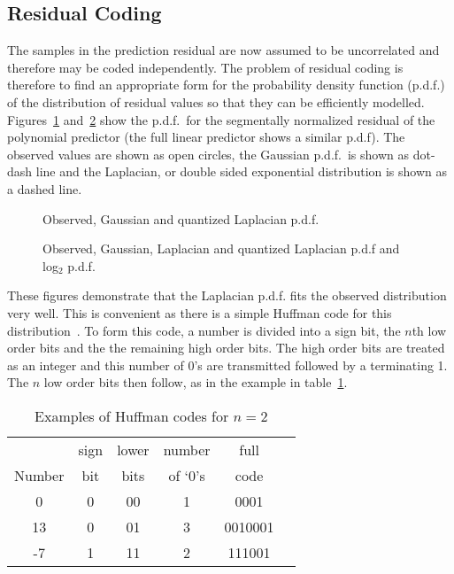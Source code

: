 \subsection{Residual Coding\label{sect:resid}}

The samples in the prediction residual are now assumed to be
uncorrelated and therefore may be coded independently.  The problem of
residual coding is therefore to find an appropriate form for the
probability density function (p.d.f.) of the distribution of residual
values so that they can be efficiently modelled.  Figures~\ref{fig:pdf}
and~\ref{fig:logpdf} show the p.d.f.\ for the segmentally normalized
residual of the polynomial predictor (the full linear predictor shows a
similar p.d.f).  The observed values are shown as open circles, the
Gaussian p.d.f.\ is shown as dot-dash line and the Laplacian, or double
sided exponential distribution is shown as a dashed line.
\begin{figure}[hbtp]
\center\mbox{}
\caption[nop]{Observed, Gaussian and quantized Laplacian p.d.f.}
\label{fig:pdf}
\end{figure}
\begin{figure}[hbtp]
\center\mbox{}
\caption[nop]{Observed, Gaussian, Laplacian and quantized Laplacian p.d.f and log$_2$ p.d.f.}
\label{fig:logpdf}
\end{figure}
These figures demonstrate that the Laplacian p.d.f. fits the observed
distribution very well.  This is convenient as there is a simple Huffman
code for this distribution~\cite{Rice71,YehRiceMiller91,Rice91}.  To
form this code, a number is divided into a sign bit, the $n$th low order
bits and the the remaining high order bits.  The high order bits are
treated as an integer and this number of 0's are transmitted followed by
a terminating 1.  The $n$ low order bits then follow, as in the example
in table~\ref{tab:rice}.
\begin{table}[hbtp]
\begin{center} \begin{tabular}{|c|c|c|c|c|c|} \hline
	     	& sign	& lower	& number & full   \\
Number      	& bit	& bits	& of `0's & code   \\\hline
0		& 0	& 00	& 1	& 0001	 \\
13		& 0	& 01	& 3	& 0010001 \\
-7		& 1	& 11	& 2	& 111001 \\\hline
\end{tabular} \end{center}
\caption[nop]{Examples of Huffman codes for $n = 2$}
\label{tab:rice}
\end{table}

